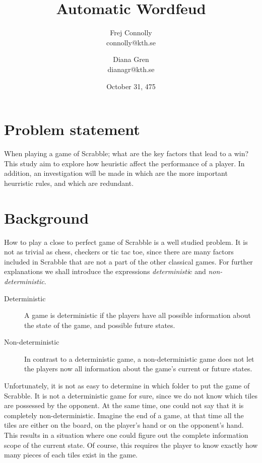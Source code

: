 \documentclass[a4paper, 12pt]{report}
\begin{document}
\title{Automatic Wordfeud}
\date{October 31, 475}
\author{Frej Connolly \\ connolly@kth.se
        \and Diana Gren \\ dianagr@kth.se}

\maketitle
\tableofcontents

\chapter{Problem statement}
When playing a game of Scrabble; what are the key factors that lead to a win? This study aim to explore how heuristic affect the performance of a player. In addition, an investigation will be made in which are the more important heurristic rules, and which are redundant.
\chapter{Background}
How to play a close to perfect game of Scrabble is a well studied problem. It is not as trivial as chess, checkers or tic tac toe, since there are many factors included in Scrabble that are not a part of the other classical games. For further explanations we shall introduce the expressions \emph{deterministi}c and \emph{non-deterministic}. 

\begin{description}
\item[Deterministic] A game is deterministic if the players have all possible information about the state of the game, and possible future states.
\item[Non-deterministic] In contrast to a deterministic game, a non-deterministic game does not let the players now all information about the game's current or future states.
\end{description}

Unfortunately, it is not as easy to determine in which folder to put the game of Scrabble. It is not a deterministic game for sure, since we do not know which tiles are possessed by the opponent. At the same time, one could not say that it is completely non-deterministic. Imagine the end of a game, at that time all the tiles are either on the board, on the player's hand or on the opponent's hand. This results in a situation where one could figure out the complete information scope of the current state. Of course, this requires the player to know exactly how many pieces of each tiles exist in the game.
\end{document}
